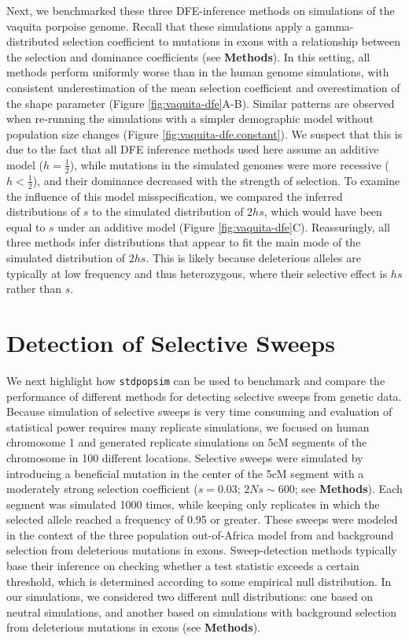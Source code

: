 \documentclass[hidelinks]{article}
\newcommand{\stdpopsim}{\texttt{stdpopsim}\xspace}
\begin{document}
    Next, we benchmarked these three DFE-inference methods on simulations of the vaquita porpoise genome.
    Recall that these simulations apply a gamma-distributed selection coefficient to mutations in exons
    with a relationship between the selection and dominance coefficients (see \textbf{Methods}).
    In this setting, all methods perform uniformly worse than in the human genome simulations,
    with consistent underestimation of the mean selection coefficient    
    and overestimation of the shape parameter (Figure \ref{fig:vaquita-dfe}A-B). 
    Similar patterns are observed when re-running the simulations with a simpler demographic model
    without population size changes (Figure \ref{fig:vaquita-dfe.constant}).
    We suspect that this is due to the fact that all DFE inference methods used here assume an additive model ($h = \frac{1}{2}$),
    while mutations in the simulated genomes were more recessive ($h < \frac{1}{2}$), and their dominance decreased with the strength of selection. 
    To examine the influence of this model misspecification, we compared the inferred distributions of $s$ to the 
    simulated distribution of $2hs$, which would have been equal to $s$ under an additive model (Figure \ref{fig:vaquita-dfe}C).
    Reassuringly, all three methods infer distributions that appear to fit the main mode of the simulated distribution of $2hs$.
    This is likely because deleterious alleles are typically at low frequency and thus heterozygous, 
    where their selective effect is $h s$ rather than $s$.

\section*{Detection of Selective Sweeps}
    \label{sweeps}
    We next highlight how \stdpopsim can be used to benchmark and compare
    the performance of different methods for detecting selective sweeps from genetic data.
    Because simulation of selective sweeps is very time consuming and evaluation of statistical power requires
    many replicate simulations, we focused on human chromosome 1 and generated replicate simulations on 5cM segments
    of the chromosome in 100 different locations. %
    Selective sweeps were simulated by introducing a beneficial mutation in the center of the 5cM segment
    with a moderately strong selection coefficient ($s = 0.03$; $2Ns \sim 600$; see \textbf{Methods}).
    Each segment was simulated 1000 times, while keeping only replicates in which the selected allele reached a frequency of 0.95 or greater.
    These sweeps were modeled in the context of the three population out-of-Africa model from \cite{gutenkunst2009inferring}
    and background selection from deleterious mutations in exons.
    Sweep-detection methods typically base their inference on checking whether a test statistic
    exceeds a certain threshold, which is determined according to some empirical null distribution.
    In our simulations, we considered two different null distributions:
    one based on neutral simulations, and another based on simulations with background selection
    from deleterious mutations in exons (see \textbf{Methods}).
  
\end{document}
